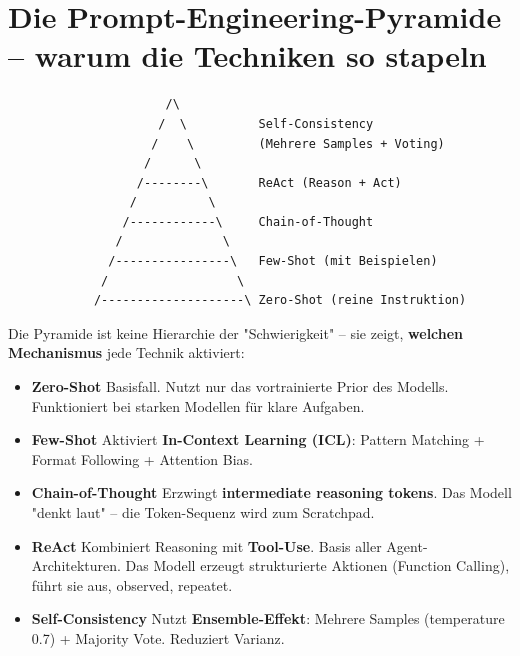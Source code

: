 \section{Die Prompt-Engineering-Pyramide -- warum die Techniken so stapeln}

\begin{verbatim}
                      /\
                     /  \          Self-Consistency
                    /    \         (Mehrere Samples + Voting)
                   /      \
                  /--------\       ReAct (Reason + Act)
                 /          \
                /------------\     Chain-of-Thought
               /              \
              /----------------\   Few-Shot (mit Beispielen)
             /                  \
            /--------------------\ Zero-Shot (reine Instruktion)
\end{verbatim}

Die Pyramide ist keine Hierarchie der "Schwierigkeit" -- sie zeigt, \textbf{welchen Mechanismus} jede Technik aktiviert:

\begin{itemize}

    \item \textbf{Zero-Shot} Basisfall. Nutzt nur das vortrainierte Prior des Modells. Funktioniert bei starken Modellen für klare Aufgaben.
    \item \textbf{Few-Shot} Aktiviert \textbf{In-Context Learning (ICL)}: Pattern Matching + Format Following + Attention Bias. 
    \item \textbf{Chain-of-Thought} Erzwingt \textbf{intermediate reasoning tokens}. Das Modell "denkt laut" -- die Token-Sequenz wird zum Scratchpad. 
    \item \textbf{ReAct} Kombiniert Reasoning mit \textbf{Tool-Use}. Basis aller Agent-Architekturen. Das Modell erzeugt strukturierte Aktionen (Function Calling), führt sie aus, observed, repeatet.
    \item \textbf{Self-Consistency} Nutzt \textbf{Ensemble-Effekt}: Mehrere Samples (temperature 0.7) + Majority Vote. Reduziert Varianz. 
\end{itemize}

